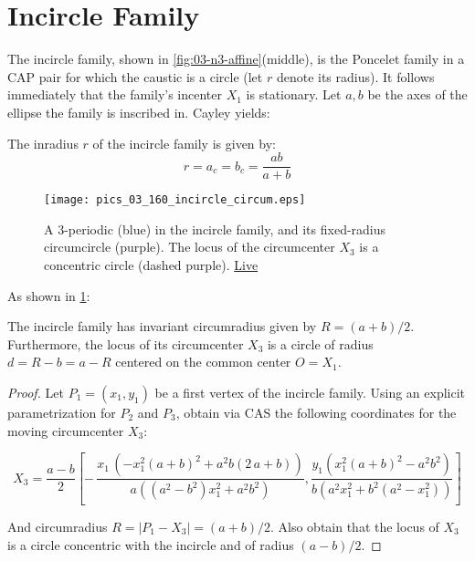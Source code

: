   
\section{Incircle Family}
The incircle family, shown in \cref{fig:03-n3-affine}(middle), is the Poncelet family in a CAP pair for which the caustic is a circle (let $r$ denote its radius). It follows immediately that the family's incenter $X_1$ is stationary. Let $a,b$ be the axes of the ellipse the family is inscribed in. Cayley yields:

\begin{proposition}
The inradius $r$ of the incircle family is given by: 
\[ r=a_c=b_c=\frac{a b}{a+b} \]
\label{prop:03-incircle}
\end{proposition} 

\begin{figure}
    \centering
    \texttt{[image: pics\_03\_160\_incircle\_circum.eps]}
    \caption{A 3-periodic (blue) in the incircle family, and its fixed-radius circumcircle (purple). The locus of the circumcenter $X_3$ is a concentric circle (dashed purple). \href{https://bit.ly/3thddWK}{Live}}
    \label{fig:03-incircle-circum}
\end{figure}

As shown in \cref{fig:03-incircle-circum}:

\begin{proposition}
The incircle family has invariant circumradius given by $R=(a+b)/2$. Furthermore, the locus of its circumcenter $X_3$ is a circle of radius $d=R-b=a-R$ centered on the common center $O=X_1$.
\label{prop:n3-incircle-R}
\end{proposition}

\begin{proof}
Let $P_1=(x_1,y_1)$ be a first vertex of the incircle family. Using an explicit parametrization for $P_2$ and $P_3$, obtain via CAS the following coordinates for the moving circumcenter $X_3$:

{\scriptsize
\[
X_3=\frac{a-b}{2}\left[ - \,{\frac {x_1\, \left( -x_1^{2}
			\left( a+b \right) ^{2}+{a}^{2} b \left( 2\,a+b \right)  \right) }{ a
			\left(  \left( {a}^{2}-{b}^{2} \right) x_1^{2}+{a}^{2}{b}^{2}
			\right) }}
	 ,  {\frac { y_1\left( x_1^{2} \left( a+b
	 		\right) ^{2}-{a}^{2}{b}^{2} \right)}{b \left( {a}^{2}x_1^2+{b}^{2} \left( {a}^{2}-x_1^{2} \right)  \right) }}
	   \right]
 \]
 }

And circumradius $R=|P_1-X_3|=(a+b)/2$. Also obtain that the locus of $X_3$ is a circle concentric with the incircle and of radius $(a-b)/2$.
\end{proof}

